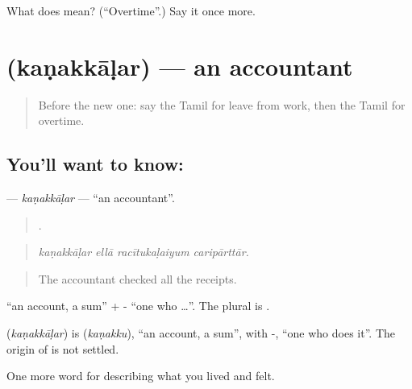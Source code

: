 \begin{tcolorbox}[breakable,colback=teal!4,colframe=teal!35!black,title={Before you move on}]
What does   mean? (\textquotedblleft{}Overtime\textquotedblright{}.) Say it once more.
\end{tcolorbox}
\section[\texorpdfstring{\ta{கணக்காளர்} (kaṇakkāḷar)}{கணக்காளர் (kaṇakkāḷar)}]{ (kaṇakkāḷar) — an accountant}

\label{lesson:TA-C508-kanakkalar}



\begin{quote}
Before the new one: say the Tamil for leave from work, then the Tamil for overtime.
\end{quote}

\subsection*{You'll want to know: }
\textbf{} — \emph{kaṇakkāḷar} — \textquotedblleft{}an accountant\textquotedblright{}.

\begin{quote}
   .
\end{quote}

\begin{quote}
\emph{kaṇakkāḷar ellā racītukaḷaiyum caripārttār.}
\end{quote}

\begin{quote}
The accountant checked all the receipts.
\end{quote}

 \textquotedblleft{}an account, a sum\textquotedblright{} + - \textquotedblleft{}one who …\textquotedblright{}. The plural is .

\begin{cousinweb}
\textbf{} (\emph{kaṇakkāḷar}) is  (\emph{kaṇakku}), \textquotedblleft{}an account, a sum\textquotedblright{}, with -, \textquotedblleft{}one who does it\textquotedblright{}. The origin of  is not settled.
\end{cousinweb}

\begin{grammarlens}[title={What you've built}]
One more word for describing what you lived and felt.
\end{grammarlens}

